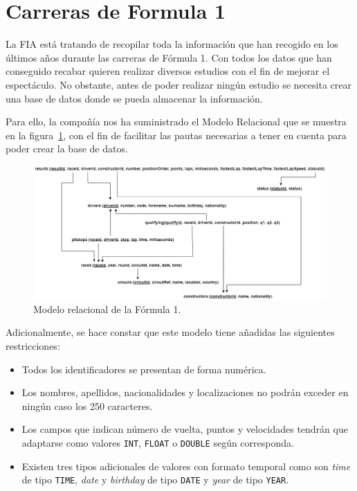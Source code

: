 \documentclass[a4paper]{article}
\begin{document}
\section*{Carreras de Formula 1}

La \ac{FIA} está tratando de recopilar toda la información que han recogido en los últimos años durante las carreras de Fórmula 1. Con todos los datos que han conseguido recabar quieren realizar diversos estudios con el fin de mejorar el espectáculo. No obstante, antes de poder realizar ningún estudio se necesita crear una base de datos donde se pueda almacenar la información. 

Para ello, la compañía nos ha suministrado el Modelo Relacional que se muestra en la figura~\ref{fig:relacional}, con el fin de facilitar las pautas necesarias a tener en cuenta para poder crear la base de datos.

\begin{figure}[H]
  \centering
  \includegraphics[width=\textwidth]{figs/modelo-relacional}
  \caption{Modelo relacional de la Fórmula 1.}
  \label{fig:relacional}
\end{figure}

Adicionalmente, se hace constar que este modelo tiene añadidas las siguientes restricciones:
\begin{itemize}
    \item Todos los identificadores se presentan de forma numérica.
    \item Los nombres, apellidos, nacionalidades y localizaciones no podrán exceder en ningún caso los 250 caracteres.
    \item Los campos que indican número de vuelta, puntos y velocidades tendrán que adaptarse como valores \texttt{INT}, \texttt{FLOAT} o \texttt{DOUBLE} según corresponda.
    \item Existen tres tipos adicionales de valores con formato temporal como son \textit{time} de tipo \texttt{TIME}, \textit{date} y \textit{birthday} de tipo \texttt{DATE} y \textit{year} de tipo \texttt{YEAR}.
\end{itemize}
\end{document}
